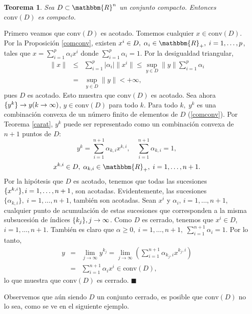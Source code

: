 \documentclass[a4paper,12pt]{report}
\newcommand{\RR}{\mathbbm{R}}
\newcommand{\Rn}{\RR^n}
\newcommand{\arr}{\rightarrow}
\newtheorem{teo}{Teorema}[section]
\newenvironment{dem}{\vspace*{-0.1cm}{\it Demostraci\'on:}}{\hfill
$\blacksquare$\\}
\newcounter{ejemplo}
\begin{document}
\begin{teo}\label{capsulaconv}
Sea $D\subset\Rn$ un conjunto compacto. Entonces $\mathrm{conv}(D)$ es compacto.
\end{teo}
\begin{dem}
Primero veamos que $\mathrm{conv}(D)$ es acotado. Tomemos cualquier \linebreak $x\in\mathrm{conv}(D)$. Por la Proposici\'on \ref{comconv}, existen $x^i\in D,\;\alpha_i\in\RR_+,\;i=1,\ldots,p$, tales que $x=\sum_{i=1}^{p}\alpha_i x^i$ donde $\sum_{i=1}^{p}\alpha_i=1$.
Por la desigualdad triangular,
\begin{eqnarray*}
\|x\|&\leq&\sum_{i=1}^{p}|\alpha_i|\|x^i\|\leq\sup_{y\in D}\|y\|\sum_{i=1}^{p}\alpha_i\\
&=&\sup_{y\in D}\|y\|<+\infty,
\end{eqnarray*}
pues $D$ es acotado. Esto muestra que $\textrm{conv}(D)$ es acotado.
Sea ahora $\{y^k\}\arr y \linebreak (k\arr\infty)$, $y\in\textrm{conv}(D)$ para todo $k$. Para todo $k,\;y^k$ es una combinaci\'on convexa de un n\'umero finito de elementos de $D$ (\ref{comconv}). Por Teorema \ref{carat}, $y^k$ puede ser representado como un combinaci\'on convexa de $n+1$ puntos de $D$:
$$y^k=\sum_{i=1}^{n+1}\alpha_{k,i}x^{k,i},\quad \sum_{i=1}^{n+1}\alpha_{k,i}=1,$$
$$x^{k,i}\in D,\;\alpha_{k,i}\in\RR_+,\;i=1,\ldots,n+1.$$
Por la hip\'otesis que $D$ es acotado, tenemos que todas las sucesiones $\{x^{k,i}\},\linebreak i=1,\ldots,n+1$, son acotadas. Evidentemente, las sucesiones $\{\alpha_{k,i}\},\;i=1,\ldots,n+1$, tambi\'en son acotadas. Sean $x^i$ y $\alpha_i$, $i=1,\ldots,n+1$, cualquier punto de acumulaci\'on de estas sucesiones que corresponden a la misma subsucesi\'on de \'indices $\{k_j\},\linebreak j\arr\infty$. Como $D$ es cerrado, tenemos que $x^i\in D$, $i=1,\ldots,n+1$. Tambi\'en es claro que $\alpha\geq 0,\;i=1,\ldots,n+1,\; \sum_{i=1}^{n+1}\alpha_i =1$. Por lo tanto,
\begin{eqnarray*}
y&=&\lim_{j\arr\infty}y^{k_j}=\lim_{j\arr\infty}\left(\sum_{i=1}^{n+1}\alpha_{k_j,i}x^{{k_j},i}\right)\\
&=&\sum_{i=1}^{n+1}\alpha_i x^i\in\textrm{conv}(D),
\end{eqnarray*}
lo que muestra que $\mathrm{conv}(D)$ es cerrado.
\end{dem}

Observemos que a\'un siendo $D$ un conjunto cerrado, es posible que $\mathrm{conv}(D)$ no lo sea, como se ve en el siguiente ejemplo.
\end{document}
